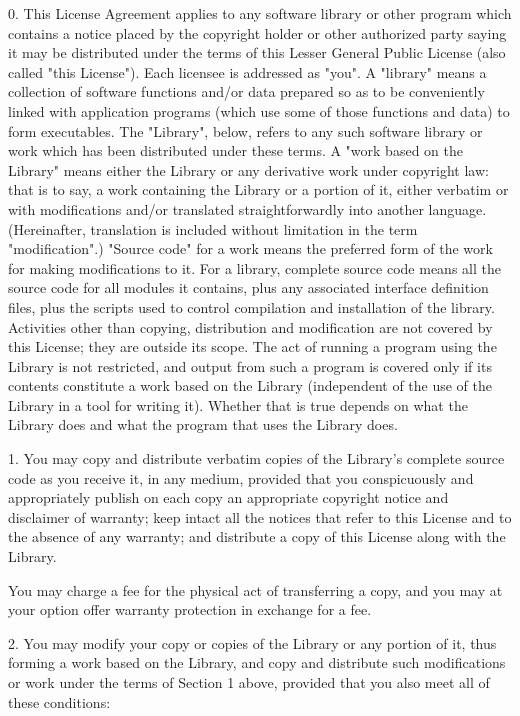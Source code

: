 0. This License Agreement applies to any software library or other program which contains a notice placed by the copyright holder or other authorized party saying it may be distributed under the terms of this Lesser General Public License (also called "this License"). Each licensee is addressed as "you". A "library" means a collection of software functions and/or data prepared so as to be conveniently linked with application programs (which use some of those functions and data) to form executables. The "Library", below, refers to any such software library or work which has been distributed under these terms. A "work based on the Library" means either the Library or any derivative work under copyright law: that is to say, a work containing the Library or a portion of it, either verbatim or with modifications and/or translated straightforwardly into another language. (Hereinafter, translation is included without limitation in the term "modification".) "Source code" for a work means the preferred form of the work for making modifications to it. For a library, complete source code means all the source code for all modules it contains, plus any associated interface definition files, plus the scripts used to control compilation and installation of the library. Activities other than copying, distribution and modification are not covered by this License; they are outside its scope. The act of running a program using the Library is not restricted, and output from such a program is covered only if its contents constitute a work based on the Library (independent of the use of the Library in a tool for writing it). Whether that is true depends on what the Library does and what the program that uses the Library does.

1. You may copy and distribute verbatim copies of the Library's complete source code as you receive it, in any medium, provided that you conspicuously and appropriately publish on each copy an appropriate copyright notice and disclaimer of warranty; keep intact all the notices that refer to this License and to the absence of any warranty; and distribute a copy of this License along with the Library.

You may charge a fee for the physical act of transferring a copy, and you may at your option offer warranty protection in exchange for a fee.

2. You may modify your copy or copies of the Library or any portion of it, thus forming a work based on the Library, and copy and distribute such modifications or work under the terms of Section 1 above, provided that you also meet all of these conditions:

